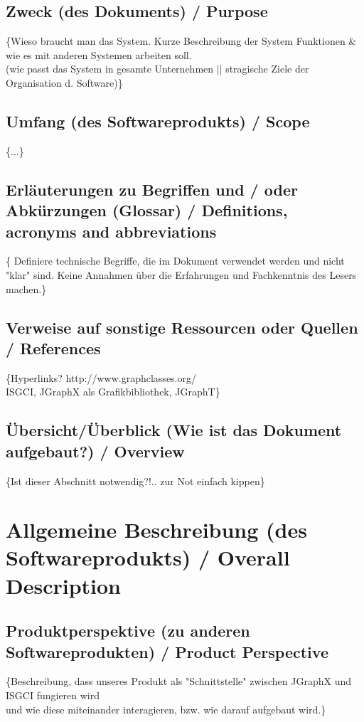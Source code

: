 \documentclass[11pt,a4paper]{article}
\begin{document}
{ 	\subsection{Zweck (des Dokuments) / Purpose} %
	\{Wieso braucht man das System. Kurze Beschreibung der System Funktionen \& wie es mit anderen Systemen arbeiten soll.\\
	(wie passt das System in gesamte Unternehmen || stragische Ziele der Organisation d. Software)\}
  	\subsection{Umfang (des Softwareprodukts) / Scope} %
   \{...\}
  	\subsection{Erläuterungen zu Begriffen und / oder Abkürzungen (Glossar) / Definitions, acronyms and abbreviations} %
	\{        Definiere technische Begriffe, die im Dokument verwendet werden und nicht "klar" sind.
	        Keine Annahmen über die Erfahrungen und Fachkenntnis des Lesers machen.\}
  	\subsection{Verweise auf sonstige Ressourcen oder Quellen / References} %
  	\{Hyperlinks? http://www.graphclasses.org/\\
          ISGCI, JGraphX als Grafikbibliothek, JGraphT\}
  	\subsection{Übersicht/Überblick (Wie ist das Dokument aufgebaut?) / Overview} %
  	\{Ist dieser Abschnitt notwendig?!.. zur Not einfach kippen\}
  	
\section{Allgemeine Beschreibung (des Softwareprodukts) / Overall Description} %
  	\subsection{Produktperspektive (zu anderen Softwareprodukten) / Product Perspective} %
	\{Beschreibung, dass unseres Produkt als "Schnittstelle" zwischen JGraphX und ISGCI fungieren wird\\
	und wie diese miteinander interagieren, bzw. wie darauf aufgebaut wird.\}
}
\end{document}
